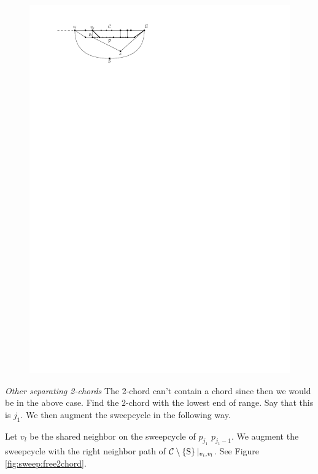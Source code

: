     \begin{figure}[h]
      \centering
      \includegraphics[scale=1]{unifiedAlgo/img/pEBound}
      \caption{}
      \label{fig:sweep:pEBound}
    \end{figure}
    \emph{Other separating 2-chords}
    The 2-chord can't contain a chord since then we would be in the above case.
    Find the $2$-chord with the lowest end of range. Say that this is $j_1$. We then augment the sweepcycle in the following way.

    Let $v_l$ be the shared neighbor on the sweepcycle of $p_{j_1}$ $p_{j_1 -1}$. We augment the sweepcycle with the right neighbor path of $\mathcal{C} \setminus \left\lbrace {\mathrm{S}} \right\rbrace|_{v_i, v_l}$. See Figure \ref{fig:sweep:free2chord}.

